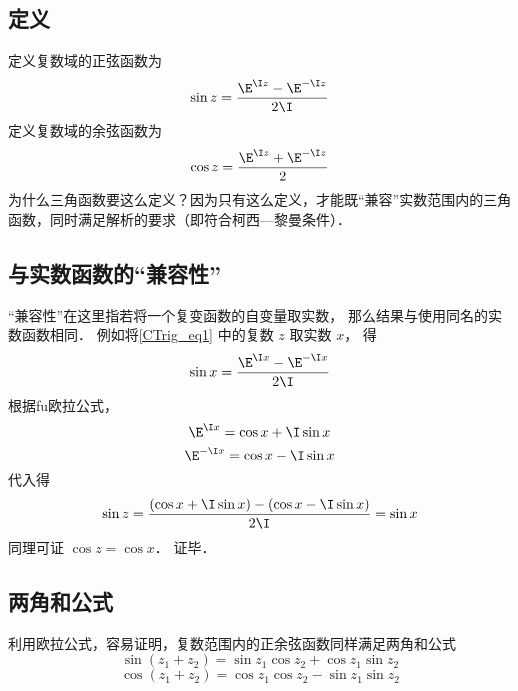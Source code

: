 
\subsection{定义}
定义复数域的正弦函数为
\begin{equation}\label{CTrig_eq1}
\sin z = \frac{\E^{\I z} - \E^{-\I z}}{2\I}
\end{equation}
定义复数域的余弦函数为
\begin{equation}\label{CTrig_eq2}
\cos z = \frac{\E^{\I z} + \E^{-\I z}}{2}
\end{equation}
为什么三角函数要这么定义？因为只有这么定义，才能既“兼容”实数范围内的三角函数，同时满足解析的要求（即符合柯西—黎曼条件）．

\subsection{与实数函数的“兼容性”}
“兼容性”在这里指若将一个复变函数的自变量取实数， 那么结果与使用同名的实数函数相同． 例如将\autoref{CTrig_eq1} 中的复数 $z$ 取实数 $x$， 得
\begin{equation}
\sin x = \frac{\E^{\I x} - \E^{-\I x}}{2\I}
\end{equation} 
根据fu欧拉公式，
\begin{equation}
\E^{\I x} = \cos x + \I\sin x
\end{equation} 
\begin{equation}
\E^{-\I x} = \cos x - \I \sin x
\end{equation} 
代入得
\begin{equation}
\sin z = \frac{(\cos x + \I\sin x) - (\cos x - \I\sin x)}{2\I} = \sin x
\end{equation}  
同理可证 $\cos z = \cos x$． 证毕．

\subsection{两角和公式}
利用欧拉公式，容易证明，复数范围内的正余弦函数同样满足两角和公式
\begin{equation}\label{CTrig_eq3}
\sin(z_1 + z_2) = \sin {z_1}\cos {z_2} + \cos {z_1}\sin {z_2}
\end{equation}
\begin{equation}\label{CTrig_eq4}
\cos (z_1 + z_2) = \cos {z_1}\cos {z_2} - \sin {z_1}\sin {z_2}
\end{equation}
